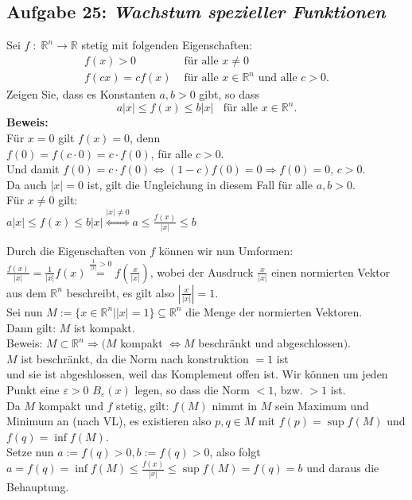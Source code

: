\subsection*{Aufgabe 25: \mdseries\itshape Wachstum spezieller Funktionen}
Sei $f \; : \; \mathbb{R}^n \rightarrow \mathbb{R}$ stetig mit folgenden Eigenschaften:
    $$\begin{array}{rl}
        f(x) > 0 & \text{ für alle } x\not= 0\\
        f(cx) = c f(x) & \text{ für alle } x\in \mathbb{R}^n \text{ und alle }c > 0.
    \end{array}$$
    Zeigen Sie, dass es Konstanten $a,b > 0$ gibt, so dass
    $$
        a|x| \leq f(x) \leq b|x| \; \; \text{ für alle } x \in \mathbb{R}^n.
    $$
\textbf{Beweis:}\\
    Für $x = 0$ gilt $f(x) = 0$, denn \\
    $f(0) = f(c \cdot 0) = c \cdot f(0)$, für alle $c > 0$. \\
    Und damit $f(0) = c \cdot f(0) \Leftrightarrow (1 - c) f(0) = 0 \Rightarrow f(0) = 0$, $c > 0$. \\

    Da auch $|x| = 0$ ist, gilt die Ungleichung in diesem Fall für alle $a, b > 0$. \\


    Für $x \neq 0$ gilt: \\
    $a |x| \leq f(x) \leq b|x| \stackrel{|x| \neq 0}{\Leftrightarrow} a \leq \frac{f(x)}{|x|} \leq b$

    Durch die Eigenschaften von $f$ können wir nun Umformen: \\
    $\frac{f(x)}{|x|} = \frac{1}{|x|} f(x) \stackrel{\frac{1}{|x|} > 0}{=}
    f(\frac{x}{|x|})$, wobei der Ausdruck $\frac{x}{|x|}$ einen normierten Vektor
    aus dem $\mathbb{R}^n$ beschreibt, es gilt also $| \frac{x}{|x|} | = 1$. \\
    
    Sei nun $M := \{x \in \mathbb{R}^n | |x| = 1 \} \subseteq \mathbb{R}^n$ 
    die Menge der normierten Vektoren.\\
    Dann gilt: $M$ ist kompakt. \\
    Beweis: $M \subset \mathbb{R}^n \Rightarrow (M$ kompakt 
    $\Leftrightarrow M$ beschränkt und abgeschlossen$)$. \\
    $M$ ist beschränkt, da die Norm nach konstruktion $= 1$ ist\\
    und sie ist abgeshlossen, weil das Komplement offen ist. Wir können um jeden Punkt eine $\varepsilon>0$ $B_\varepsilon (x)$ legen,
   so dass die Norm $<1$, bzw. $>1$ ist. \\

    Da $M$ kompakt und $f$ stetig, gilt: $f(M)$ nimmt in $M$ sein Maximum und Minimum an (nach VL), es existieren also $p,q \in M$ mit $f(p) = \sup f(M)$ und $f(q) = \inf f(M)$. \\
    Setze nun $a := f(q) > 0, b := f(q) > 0$, also folgt \\
    $ a = f(q) = \inf f(M) \leq \frac{f(x)}{|x|} \leq \sup f(M) = f(q) = b $ und daraus die Behauptung.
